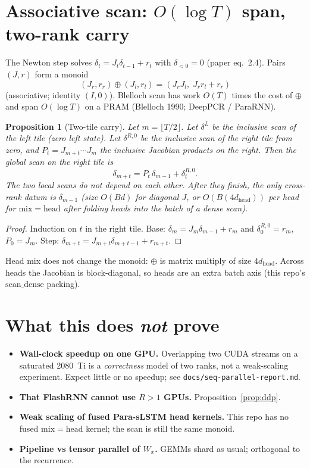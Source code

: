 \documentclass[11pt]{article}
\theoremstyle{plain}
\newtheorem{proposition}{Proposition}
\begin{document}
\section[Associative scan]{Associative scan: $O(\log T)$ span, two-rank carry}

The Newton step solves $\delta_t = J_t \delta_{t-1} + r_t$ with
$\delta_{<0}=0$ (paper eq.~2.4). Pairs $(J,r)$ form a monoid
\[
(J_r, r_r)\oplus(J_l, r_l) = (J_r J_l,\; J_r r_l + r_r)
\]
(associative; identity $(I,0)$). Blelloch scan has work $O(T)$ times the
cost of $\oplus$ and span $O(\log T)$ on a PRAM (Blelloch 1990; DeepPCR /
ParaRNN).

\begin{proposition}[Two-tile carry]
\label{prop:twotile}
Let $m=\lfloor T/2\rfloor$. Let $\delta^{L}$ be the inclusive scan of the
left tile (zero left state). Let $\delta^{R,0}$ be the inclusive scan of the
right tile from zero, and $P_t = J_{m+t}\cdots J_m$ the inclusive Jacobian
products on the right. Then the global scan on the right tile is
\[
\delta_{m+t} = P_t\,\delta_{m-1} + \delta^{R,0}_t.
\]
The two local scans do not depend on each other. After they finish, the only
cross-rank datum is $\delta_{m-1}$ (size $O(Bd)$ for diagonal $J$, or
$O(B(4d_{\mathrm{head}}))$ per head for $\mathrm{mix}=\mathrm{head}$ after
folding heads into the batch of a dense scan).
\end{proposition}

\begin{proof}
Induction on $t$ in the right tile. Base: $\delta_m = J_m \delta_{m-1}+r_m$
and $\delta^{R,0}_0 = r_m$, $P_0=J_m$. Step: $\delta_{m+t}=J_{m+t}\delta_{m+t-1}+r_{m+t}$.
\end{proof}

Head mix does not change the monoid: $\oplus$ is matrix multiply of size
$4d_{\mathrm{head}}$. Across heads the Jacobian is block-diagonal, so heads
are an extra batch axis (this repo's $\mathrm{scan\_dense}$ packing).

\section{What this does \emph{not} prove}

\begin{itemize}
  \item \textbf{Wall-clock speedup on one GPU.} Overlapping two CUDA streams
        on a saturated 2080~Ti is a \emph{correctness} model of two ranks,
        not a weak-scaling experiment. Expect little or no speedup; see
        \texttt{docs/seq-parallel-report.md}.
  \item \textbf{That FlashRNN cannot use $R>1$ GPUs.} Proposition~\ref{prop:ddp}.
  \item \textbf{Weak scaling of fused Para-sLSTM head kernels.} This repo has
        no fused $\mathrm{mix}=\mathrm{head}$ kernel; the scan is still the
        same monoid.
  \item \textbf{Pipeline vs tensor parallel of $W_x$.} GEMMs shard as usual;
        orthogonal to the recurrence.
\end{itemize}
\end{document}
